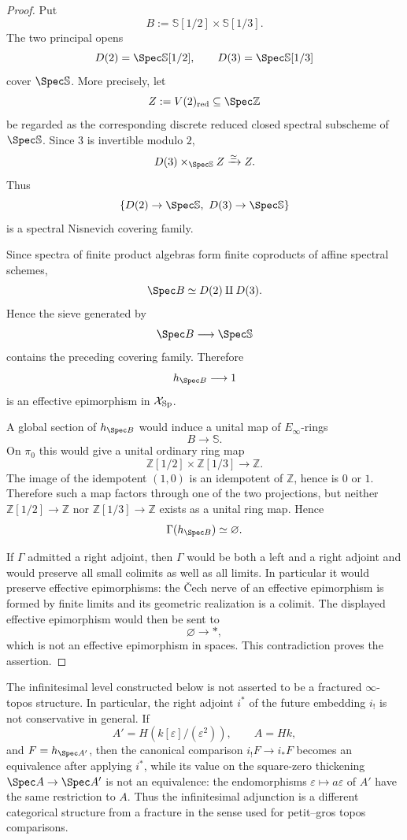 \begin{proof}
Put
\[
    B:=\mathbb S[1/2]\times\mathbb S[1/3].
\]
The two principal opens
\[
    D(2)=\Spec\mathbb S[1/2],
    \qquad
    D(3)=\Spec\mathbb S[1/3]
\]
cover $\Spec\mathbb S$.  More precisely, let
\[
    Z:=V(2)_{\mathrm{red}}\subseteq\Spec\mathbb Z
\]
be regarded as the corresponding discrete reduced closed spectral subscheme
of $\Spec\mathbb S$.  Since $3$ is invertible modulo $2$,
\[
    D(3)\times_{\Spec\mathbb S}Z\xrightarrow{\simeq}Z.
\]
Thus
\[
    \{D(2)\to\Spec\mathbb S,\ D(3)\to\Spec\mathbb S\}
\]
is a spectral Nisnevich covering family.

Since spectra of finite product algebras form finite coproducts of affine
spectral schemes,
\[
    \Spec B\simeq D(2)\amalg D(3).
\]
Hence the sieve generated by
\[
    \Spec B\longrightarrow\Spec\mathbb S
\]
contains the preceding covering family.  Therefore
\[
    h_{\Spec B}\longrightarrow 1
\]
is an effective epimorphism in $\mathcal X_{\mathrm{Sp}}$.

A global section of $h_{\Spec B}$ would induce a unital map of
$E_\infty$-rings
\[
    B\longrightarrow\mathbb S.
\]
On $\pi_0$ this would give a unital ordinary ring map
\[
    \mathbb Z[1/2]\times\mathbb Z[1/3]\longrightarrow\mathbb Z.
\]
The image of the idempotent $(1,0)$ is an idempotent of $\mathbb Z$, hence is
$0$ or $1$.  Therefore such a map factors through one of the two projections,
but neither $\mathbb Z[1/2]\to\mathbb Z$ nor
$\mathbb Z[1/3]\to\mathbb Z$ exists as a unital ring map.  Hence
\[
    \Gamma(h_{\Spec B})\simeq\varnothing.
\]

If $\Gamma$ admitted a right adjoint, then $\Gamma$ would be both a left and
a right adjoint and would preserve all small colimits as well as all limits.
In particular it would preserve effective epimorphisms: the \v{C}ech nerve
of an effective epimorphism is formed by finite limits and its geometric
realization is a colimit.  The displayed effective epimorphism would then be
sent to
\[
    \varnothing\longrightarrow *,
\]
which is not an effective epimorphism in spaces.  This contradiction proves
the assertion.
\end{proof}

\begin{remark}
\label{rem:infinitesimal-not-fractured}
The infinitesimal level constructed below is not asserted to be a fractured
$\infty$-topos structure.  In particular, the right adjoint $i^*$ of the
future embedding $i_!$ is not conservative in general.  If
\[
    A'=H(k[\varepsilon]/(\varepsilon^2)),
    \qquad
    A=Hk,
\]
and $F=h_{\Spec A'}$, then the canonical comparison
$i_!F\to i_*F$ becomes an equivalence after applying $i^*$, while its value on
the square-zero thickening $\Spec A\to\Spec A'$ is not an equivalence: the
endomorphisms $\varepsilon\mapsto a\varepsilon$ of $A'$ have the same
restriction to $A$.  Thus the infinitesimal adjunction is a different
categorical structure from a fracture in the sense used for petit--gros
topos comparisons.
\end{remark}

